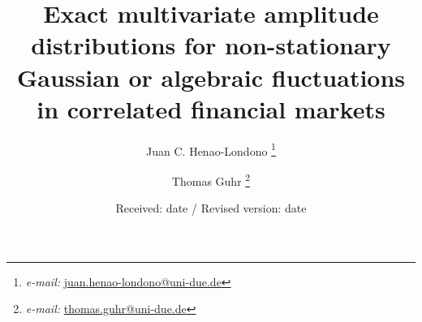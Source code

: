 \title{Exact multivariate amplitude distributions for non-stationary Gaussian
       or algebraic fluctuations in correlated financial markets}
\author{Juan C. Henao-Londono
        \thanks{\emph{e-mail: }\href{mailto:juan.henao-londono@uni-due.de}
        {juan.henao-londono@uni-due.de}}
        \and Thomas Guhr
        \thanks{\emph{e-mail: }\href{mailto:thomas.guhr@uni-due.de}
        {thomas.guhr@uni-due.de}}}
\date{Received: date / Revised version: date}
